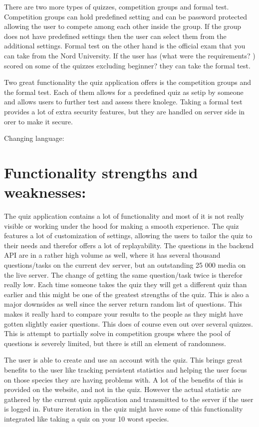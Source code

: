 There are two more types of quizzes, competition groups and formal test. Competition groups can hold predefined setting and can be password protected allowing the user to compete among each other inside the group. If the group does not have predefined settings then the user can select them from the additional settings. \newline
Formal test on the other hand is the official exam that you can take from the Nord University. If the user has (what were the requirements? ) scored on some of the quizzes excluding beginner? they can take the formal test. 

Two great functionality the quiz application offers is the competition groups and the formal test. Each of them allows for a predefined quiz as setip by someone and allows users to further test and assess there knolege. Taking a formal test provides a lot of extra security features, but they are handled on server side in orer to make it secure. 


Changing language: 


\section{Functionality strengths and weaknesses:}
\label{sec:functstengwek}
The quiz application contains a lot of functionality and most of it is not really visible or working under the hood for making a smooth experience. The quiz features a lot of customization of settings, allowing the users to tailor the quiz to their needs and therefor offers a lot of replayability. The questions in the backend API are in a rather high volume as well, where it has several thousand questions/tasks on the current dev server, but an outstanding 25 000 media on the live server. The change of getting the same question/task twice is therefor really low. Each time someone takes the quiz they will get a different quiz than earlier and this might be one of the greatest strengths of the quiz. This is also a major downsides as well since the server return  random list of questions. This makes it really hard to compare your results to the people as they might have gotten slightly easier questions. This does of course even out over several quizzes. This is attempt to partially solve in competition groups where the pool of questions is severely limited, but there is still an element of randomness.

The user is able to create and use an account with the quiz. This brings great benefits to the user like tracking persistent statistics and helping the user focus on those species they are having problems with. A lot of the benefits of this is provided on the website, and not in the quiz. However the actual statistic are gathered by the current quiz application and transmitted to the server if the user is logged in. Future iteration in the quiz might have some of this functionality integrated like taking a quiz on your 10 worst species.


